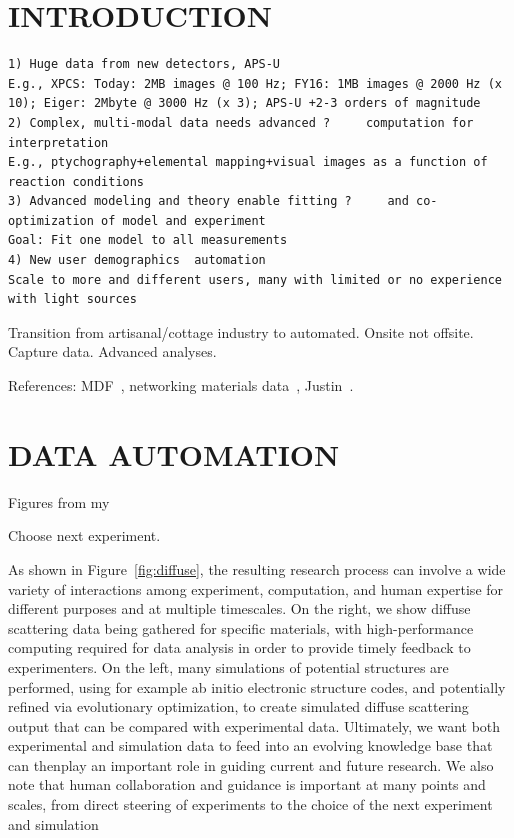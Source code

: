 \documentclass{aip-cp}
\newcommand\ian[1]{}
\newcommand\ian[1]{{\color{red}[Ian: #1]}}
\begin{document}
\ian{Potential authors: Tekin Bicer, Ben Blaiszik, Kyle Chard, Ryan Chard, Logan Ward, Justin Wozniak, ...}


\section{INTRODUCTION}

\ian{Introductory material on challenges at light sources.}

\begin{verbatim}
1) Huge data from new detectors, APS-U
E.g., XPCS: Today: 2MB images @ 100 Hz; FY16: 1MB images @ 2000 Hz (x 10); Eiger: 2Mbyte @ 3000 Hz (x 3); APS-U +2-3 orders of magnitude
2) Complex, multi-modal data needs advanced ?     computation for interpretation
E.g., ptychography+elemental mapping+visual images as a function of reaction conditions
3) Advanced modeling and theory enable fitting ?     and co-optimization of model and experiment
Goal: Fit one model to all measurements
4) New user demographics  automation
Scale to more and different users, many with limited or no experience with light sources
\end{verbatim}

Transition from artisanal/cottage industry to automated. Onsite not offsite. Capture data. Advanced analyses.



References: MDF~\cite{MDF2016}, networking materials data~\cite{foster2015networking}, Justin~\cite{wozniak2015big}.


\section{DATA AUTOMATION}

\ian{Big picture thoughts I guess.}

Figures from my 

Choose next experiment.

 
\ian{Next text and Figure~\ref{fig:diffuse} are from~\cite{foster2015networking}. Need to be rewritten.}

As shown in Figure~\ref{fig:diffuse}, the resulting research process can involve a wide variety of interactions among experiment, computation, and human expertise for different purposes and at multiple timescales. 
On the right, we show diffuse scattering data being gathered for specific materials, with high-performance computing required for data analysis in order to provide timely feedback to experimenters. 
On the left, 
many simulations of potential structures are performed, using for example ab initio electronic structure codes, 
and potentially refined via evolutionary optimization, 
to create simulated diffuse scattering output that can be compared with experimental data. 
Ultimately, we want both experimental and simulation data to feed into an evolving knowledge base that can thenplay an important role in guiding current and future research. 
We also note that human collaboration and guidance is important at many points and scales, from direct steering of experiments to the choice of the next experiment and simulation 
\end{document}
